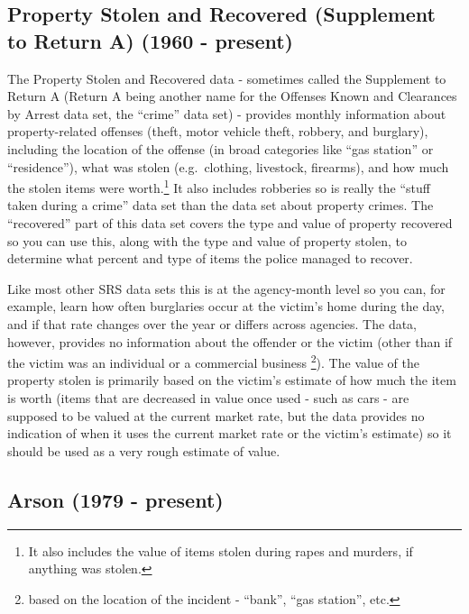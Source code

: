 \documentclass[
]{krantz}
\begin{document}
\subsection{Property Stolen and Recovered (Supplement to
Return A) (1960 -
present)}\label{property-stolen-and-recovered-supplement-to-return-a-1960---present}

The Property Stolen and Recovered data - sometimes called
the Supplement to Return A (Return A being another name for
the Offenses Known and Clearances by Arrest data set, the
``crime'' data set) - provides monthly information about
property-related offenses (theft, motor vehicle theft,
robbery, and burglary), including the location of the
offense (in broad categories like ``gas station'' or
``residence''), what was stolen (e.g.~clothing, livestock,
firearms), and how much the stolen items were
worth.\footnote{It also includes the value of items stolen
  during rapes and murders, if anything was stolen.} It also
includes robberies so is really the ``stuff taken during a
crime'' data set than the data set about property crimes. The
``recovered'' part of this data set covers the type and value
of property recovered so you can use this, along with the
type and value of property stolen, to determine what percent
and type of items the police managed to recover.

Like most other SRS data sets this is at the agency-month
level so you can, for example, learn how often burglaries
occur at the victim's home during the day, and if that rate
changes over the year or differs across agencies. The data,
however, provides no information about the offender or the
victim (other than if the victim was an individual or a
commercial business \footnote{based on the location of the
  incident - ``bank'', ``gas station'', etc.}). The value of
the property stolen is primarily based on the victim's
estimate of how much the item is worth (items that are
decreased in value once used - such as cars - are supposed
to be valued at the current market rate, but the data
provides no indication of when it uses the current market
rate or the victim's estimate) so it should be used as a
very rough estimate of value.

\subsection{Arson (1979 -
present)}\label{arson-1979---present}
\end{document}
